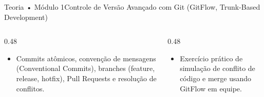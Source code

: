 \begin{senaiframe}{Teoria • Módulo 1}{Controle de Versão Avançado com Git (GitFlow, Trunk-Based Development)}
  \begin{columns}[t]
    \begin{column}{0.48\textwidth}
      \begin{tcolorbox}[senaibluecard, title={Fundamentos Teóricos}]
        \begin{itemize}
          \item Commits atômicos, convenção de mensagens (Conventional Commits), branches (feature, release, hotfix), Pull Requests e resolução de conflitos.
        \end{itemize}
      \end{tcolorbox}
    \end{column}
    \begin{column}{0.48\textwidth}
      \begin{tcolorbox}[senaigreencard, title={Prática \& Laboratório}]
        \begin{itemize}
          \item Exercício prático de simulação de conflito de código e merge usando GitFlow em equipe.
        \end{itemize}
      \end{tcolorbox}
    \end{column}
  \end{columns}
\end{senaiframe}
